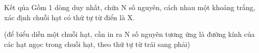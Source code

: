 Kết qủa  
Gồm 1 dòng duy nhất, chứa N số nguyên, cách nhau một khoảng trắng, xác định chuỗi hạt có thứ tự từ điển là X.  

   (để biểu diễn một chuỗi hạt, cần in ra N số nguyên tương ứng là đường kính của các hạt ngọc trong chuỗi hạt, theo thứ tự từ trái sang phải)